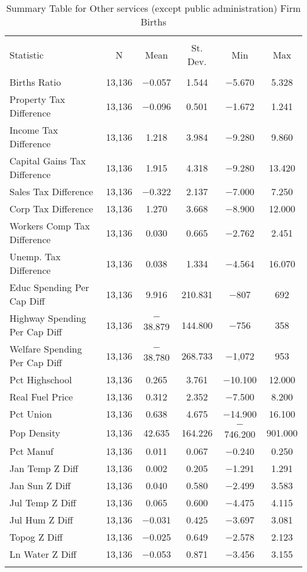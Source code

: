 
\begin{table}[!htbp] \centering 
  \caption{Summary Table for  Other services (except public administration) Firm Births} 
  \label{81summary} 
\begin{tabular}{@{\extracolsep{5pt}}lccccc} 
\\[-1.8ex]\hline 
\hline \\[-1.8ex] 
Statistic & \multicolumn{1}{c}{N} & \multicolumn{1}{c}{Mean} & \multicolumn{1}{c}{St. Dev.} & \multicolumn{1}{c}{Min} & \multicolumn{1}{c}{Max} \\ 
\hline \\[-1.8ex] 
Births Ratio & 13,136 & $-$0.057 & 1.544 & $-$5.670 & 5.328 \\ 
Property Tax Difference & 13,136 & $-$0.096 & 0.501 & $-$1.672 & 1.241 \\ 
Income Tax Difference & 13,136 & 1.218 & 3.984 & $-$9.280 & 9.860 \\ 
Capital Gains Tax Difference & 13,136 & 1.915 & 4.318 & $-$9.280 & 13.420 \\ 
Sales Tax Difference & 13,136 & $-$0.322 & 2.137 & $-$7.000 & 7.250 \\ 
Corp Tax Difference & 13,136 & 1.270 & 3.668 & $-$8.900 & 12.000 \\ 
Workers Comp Tax Difference & 13,136 & 0.030 & 0.665 & $-$2.762 & 2.451 \\ 
Unemp. Tax Difference & 13,136 & 0.038 & 1.334 & $-$4.564 & 16.070 \\ 
Educ Spending Per Cap Diff & 13,136 & 9.916 & 210.831 & $-$807 & 692 \\ 
Highway Spending Per Cap Diff & 13,136 & $-$38.879 & 144.800 & $-$756 & 358 \\ 
Welfare Spending Per Cap Diff & 13,136 & $-$38.780 & 268.733 & $-$1,072 & 953 \\ 
Pct Highschool & 13,136 & 0.265 & 3.761 & $-$10.100 & 12.000 \\ 
Real Fuel Price & 13,136 & 0.312 & 2.352 & $-$7.500 & 8.200 \\ 
Pct Union & 13,136 & 0.638 & 4.675 & $-$14.900 & 16.100 \\ 
Pop Density & 13,136 & 42.635 & 164.226 & $-$746.200 & 901.000 \\ 
Pct Manuf & 13,136 & 0.011 & 0.067 & $-$0.240 & 0.250 \\ 
Jan Temp Z Diff & 13,136 & 0.002 & 0.205 & $-$1.291 & 1.291 \\ 
Jan Sun Z Diff & 13,136 & 0.040 & 0.580 & $-$2.499 & 3.583 \\ 
Jul Temp Z Diff & 13,136 & 0.065 & 0.600 & $-$4.475 & 4.115 \\ 
Jul Hum Z Diff & 13,136 & $-$0.031 & 0.425 & $-$3.697 & 3.081 \\ 
Topog Z Diff & 13,136 & $-$0.025 & 0.649 & $-$2.578 & 2.123 \\ 
Ln Water Z Diff & 13,136 & $-$0.053 & 0.871 & $-$3.456 & 3.155 \\ 
\hline \\[-1.8ex] 
\end{tabular} 
\end{table} 
